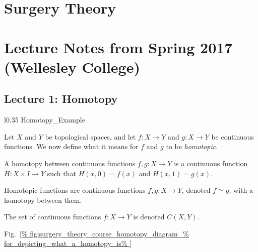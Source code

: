 \documentclass[crop=false,class=article,oneside]{standalone}
\begin{document}
    \ifx\ifmathcoursessurgery\undefined
        \section*{Surgery Theory}
        \setcounter{section}{1}
        \renewcommand\thefigure{%
            \arabic{section}.\arabic{figure}}
        \renewcommand\thesubfigure{%
            \arabic{section}.\arabic{figure}.\arabic{subfigure}}
    \else
        \section{Lecture Notes from Spring 2017 (Wellesley College)}
    \fi
    \subsection{Lecture 1: Homotopy}
        \begin{wrapfigure}[8]{l}{0.35\textwidth}
            \centering
            \captionsetup{type=figure}
            {Homotopy_Example}
            \caption[Homotopy Diagram.]
                    {Diagram for a homotopy between two
                    functions $f,g:X\rightarrow Y$.}
            \label{fig:surgery_theory_course_homotopy_diagram_%
                   for_depicting_what_a_homotopy_is}
        \end{wrapfigure}
        Let $X$ and $Y$ be topological spaces, and let
        $f:{X}\rightarrow{Y}$ and $g:{X}\rightarrow{Y}$
        be continuous functions. We now define what it
        means for $f$ and $g$ to be \textit{homotopic}.
        \begin{definition}
            A homotopy between continuous functions
            $f,g:{X}\rightarrow{Y}$ is a continuous
            function $H:{X}\times{I}\rightarrow{Y}$
            such that $H(x,0)=f(x)$ and $H(x,1)=g(x)$.
        \end{definition}
        \begin{definition}
            Homotopic functions are continuous functions
            $f,g:{X}\rightarrow{Y}$, denoted ${f}\simeq{g}$,
            with a homotopy between them.
        \end{definition}
        \begin{notation}
            The set of continuous functions
            $f:{X}\rightarrow{Y}$ is denoted $C(X,Y)$.
        \end{notation}
        Fig.~\ref{%
            fig:surgery_theory_course_homotopy_diagram_%
            for_depicting_what_a_homotopy_is%
        }
\end{document}
